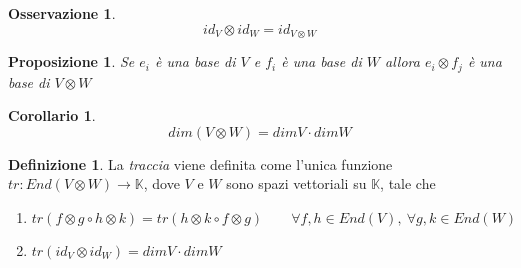 \documentclass[11pt]{article}
\theoremstyle{plain}
\newtheorem{prop}[thm]{Proposizione}
\newtheorem*{cor}{Corollario}
\theoremstyle{definition}
\newtheorem{defn}{Definizione}[section]
\newtheorem*{rem}{Osservazione}
\theoremstyle{remark}
\newcommand{\K}{\mathbb{K}}
\begin{document}
\begin{rem}

\[ id_V \otimes id_W = id_{V\otimes W}\]
\end{rem}




\begin{prop}

Se $e_i$ è una base di $V$ e $f_i$ è una base di $W$ allora $e_i \otimes f_j$ è una base di $V \otimes W$
\end{prop}


\begin{cor}
\[dim(V \otimes W) = dim V \cdot dim W \]

\end{cor}

















\begin{defn}





La \emph{traccia} viene definita come l'unica funzione $tr: End(V\otimes W) \to \K$, dove $V$ e $W$ sono spazi vettoriali su $\K$, tale che 


\begin{enumerate}
\item{ $tr\left( f \otimes g \circ h \otimes k   \right) = tr\left( h \otimes k \circ f \otimes g \right) \qquad \forall f, h \in End(V), \ \forall g, k \in End(W)$}
\item{ $tr\left( id_V \otimes id_W \right) = dimV \cdot dimW$}
\end{enumerate}







\end{defn}
\end{document}

